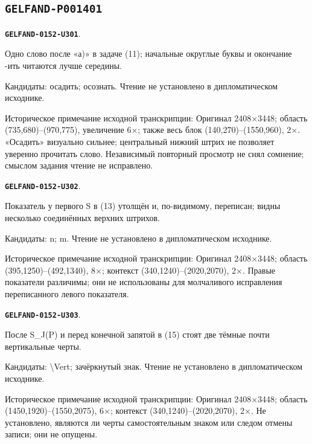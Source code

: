 \documentclass[11pt]{article}
\theoremstyle{definition}
\theoremstyle{remark}
\begin{document}
\subsection*{\texttt{GELFAND-P001401}}
\par\noindent\leavevmode{}\label{GELFAND-0152-U301}\label{GELFAND-P001401:task-a:note}\textbf{\texttt{GELFAND-0152-U301}}.\nopagebreak[4]\par
Одно слово после «а)» в задаче (11); начальные округлые буквы и окончание -ить читаются лучше середины.\par
Кандидаты: осадить; осознать. Чтение не установлено в дипломатическом исходнике.\par
Историческое примечание исходной транскрипции: Оригинал 2408×3448; область (735,680)–(970,775), увеличение 6×; также весь блок (140,270)–(1550,960), 2×. «Осадить» визуально сильнее; центральный нижний штрих не позволяет уверенно прочитать слово. Независимый повторный просмотр не снял сомнение; смыслом задания чтение не исправлено.\par\medskip
\par\noindent\leavevmode{}\label{GELFAND-0152-U302}\label{GELFAND-P001401:formula-13-power:note}\textbf{\texttt{GELFAND-0152-U302}}.\nopagebreak[4]\par
Показатель у первого S в (13) утолщён и, по-видимому, переписан; видны несколько соединённых верхних штрихов.\par
Кандидаты: n; m. Чтение не установлено в дипломатическом исходнике.\par
Историческое примечание исходной транскрипции: Оригинал 2408×3448; область (395,1250)–(492,1340), 8×; контекст (340,1240)–(2020,2070), 2×. Правые показатели различимы; они не использованы для молчаливого исправления переписанного левого показателя.\par\medskip
\par\noindent\leavevmode{}\label{GELFAND-0152-U303}\label{GELFAND-P001401:formula-15-end:note}\textbf{\texttt{GELFAND-0152-U303}}.\nopagebreak[4]\par
После S\_J(P) и перед конечной запятой в (15) стоят две тёмные почти вертикальные черты.\par
Кандидаты: \textbackslash{}Vert; зачёркнутый знак. Чтение не установлено в дипломатическом исходнике.\par
Историческое примечание исходной транскрипции: Оригинал 2408×3448; область (1450,1920)–(1550,2075), 6×; контекст (340,1240)–(2020,2070), 2×. Не установлено, являются ли черты самостоятельным знаком или следом отмены записи; они не опущены.\par\medskip
\end{document}
